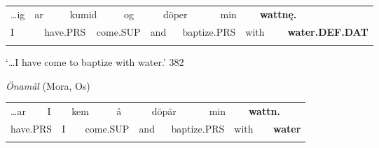 \begin{tabular}{llllllllllllll}
\lsptoprule
…ig & \multicolumn{2}{l}{ar

} & \multicolumn{2}{l}{kumid

} & \multicolumn{2}{l}{og

} & \multicolumn{2}{l}{döper

} & \multicolumn{2}{l}{min

} & \multicolumn{2}{l}{{\bfseries wattnę.}

} & \\
\multicolumn{2}{l}{ I

} & \multicolumn{2}{l}{have.PRS

} & \multicolumn{2}{l}{come.SUP

} & \multicolumn{2}{l}{and

} & \multicolumn{2}{l}{baptize.PRS

} & \multicolumn{2}{l}{with

} & \multicolumn{2}{l}{{\bfseries water.DEF.DAT}

}\\
\lspbottomrule
\end{tabular}

\begin{styleTranslation}
‘…I have come to baptize with water.’ 382

\end{styleTranslation}

\begin{styleExLtrTblii}
\textit{Önamål} (Mora, Os)

\end{styleExLtrTblii}

\begin{tabular}{llllllllllllll}
\lsptoprule
…ar & \multicolumn{2}{l}{I

} & \multicolumn{2}{l}{kem

} & \multicolumn{2}{l}{å

} & \multicolumn{2}{l}{döpär

} & \multicolumn{2}{l}{min

} & \multicolumn{2}{l}{{\bfseries wattn.}

} & \\
\multicolumn{2}{l}{ have.PRS

} & \multicolumn{2}{l}{I

} & \multicolumn{2}{l}{come.SUP

} & \multicolumn{2}{l}{and

} & \multicolumn{2}{l}{baptize.PRS

} & \multicolumn{2}{l}{with

} & \multicolumn{2}{l}{{\bfseries water}

}\\
\lspbottomrule
\end{tabular}

